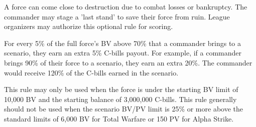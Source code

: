 A force can come close to destruction due to combat losses or bankruptcy.
The commander may stage a 'last stand' to save their force from ruin.
League organizers may authorize this optional rule for scoring.

For every 5\% of the full force's BV above 70\% that a commander brings to a scenario, they earn an extra 5\% C-bills payout.
For example, if a commander brings 90\% of their force to a scenario, they earn an extra 20\%.
The commander would receive 120\% of the C-bills earned in the scenario.

This rule may only be used when the force is under the starting BV limit of 10,000 BV and the starting balance of 3,000,000 C-bills.
This rule generally should not be used when the scenario BV/PV limit is 25\% or more above the standard limits of 6,000 BV for Total Warfare or 150 PV for Alpha Strike.
